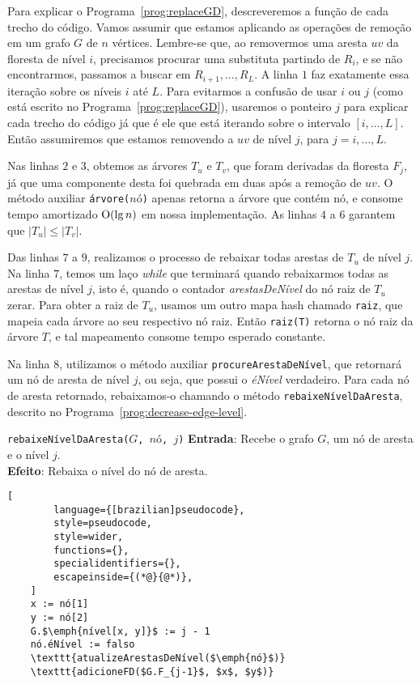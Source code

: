 Para explicar o Programa~\ref{prog:replaceGD}, descreveremos a função de cada trecho do código. Vamos assumir que estamos aplicando as operações de remoção em um grafo $G$ de $n$ vértices. Lembre-se que, ao removermos uma aresta $uv$ da floresta de nível $i$, precisamos procurar uma substituta partindo de $R_i$, e se não encontrarmos, passamos a buscar em $R_{i + 1}, \ldots, R_L$. A linha $1$ faz exatamente essa iteração sobre os níveis $i$ até $L$. Para evitarmos a confusão de usar $i$ ou $j$ (como está escrito no Programa~\ref{prog:replaceGD}), usaremos o ponteiro $j$ para explicar cada trecho do código já que é ele que está iterando sobre o intervalo $[i, \ldots, L]$. Então assumiremos que estamos removendo a $uv$ de nível $j$, para $j = i, \ldots , L$.

Nas linhas $2$ e $3$, obtemos as árvores $T_u$ e $T_v$, que foram derivadas da floresta $F_j$, já que uma componente desta foi quebrada em duas após a remoção de $uv$. O método auxiliar \texttt{árvore($\textit{nó}$)} apenas retorna a árvore que contém nó, e consome tempo amortizado $\mathrm{O}(\lg n)$ em nossa implementação. As linhas $4$ a $6$ garantem que $|T_u| \leq |T_v|$. 

Das linhas $7$ a $9$, realizamos o processo de rebaixar todas arestas de $T_u$ de nível $j$. Na linha $7$, temos um laço \textit{while} que terminará quando rebaixarmos todas as arestas de nível $j$, isto é, quando o contador \textit{arestasDeNível} do nó raiz de $T_u$ zerar. Para obter a raiz de $T_u$, usamos um outro mapa hash chamado \texttt{raiz}, que mapeia cada árvore ao seu respectivo nó raiz. Então \texttt{raiz(T)} retorna o nó raiz da árvore $T$, e tal mapeamento consome tempo esperado constante.

Na linha $8$, utilizamos o método auxiliar \texttt{procureArestaDeNível}, que retornará um nó de aresta de nível $j$, ou seja, que possui o \textit{éNível} verdadeiro. Para cada nó de aresta retornado, rebaixamos-o chamando o método \texttt{rebaixeNívelDaAresta}, descrito no Programa~\ref{prog:decrease-edge-level}.


\begin{programruledcaption}{\texttt{rebaixeNívelDaAresta($G$, $\textit{nó}$, $j$)} \label{prog:decrease-edge-level}}
    \noindent\textbf{Entrada}: Recebe o grafo $G$, um nó de aresta e o nível $j$.\\
    \textbf{Efeito}: Rebaixa o nível do nó de aresta.
    \vspace{-0.5\baselineskip}
    \begin{lstlisting}[
        language={[brazilian]pseudocode},
        style=pseudocode,
        style=wider,
        functions={},
        specialidentifiers={},
        escapeinside={(*@}{@*)},
    ]
    x := nó[1]
    y := nó[2]
    G.$\emph{nível[x, y]}$ := j - 1
    nó.éNível := falso
    \texttt{atualizeArestasDeNível($\emph{nó}$)}
    \texttt{adicioneFD($G.F_{j-1}$, $x$, $y$)}

    \end{lstlisting}
    \vspace{-0.5\baselineskip}
\end{programruledcaption}

